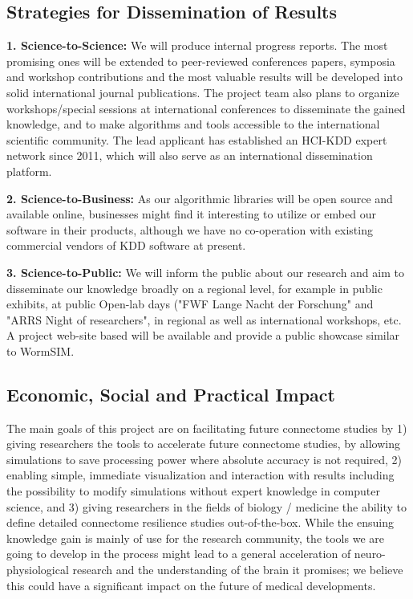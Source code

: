 \documentclass[a4paper,11pt]{article}
\begin{document}
\subsection{Strategies for Dissemination of Results}

\textbf{1. Science-to-Science:} We will produce internal progress reports. The most promising ones will be extended to peer-reviewed conferences papers, symposia and workshop contributions and the most valuable results will be developed into solid international journal publications. The project team also plans to organize workshops/special sessions at international conferences to disseminate the gained knowledge, and to make algorithms and tools accessible to the international scientific community. The lead applicant has established an HCI-KDD expert network since 2011, which will also serve as an international dissemination platform.

\textbf{2. Science-to-Business:} As our algorithmic libraries will be open source and available online, businesses might find it interesting to utilize or embed our software in their products, although we have no co-operation with existing commercial vendors of KDD software at present.

\textbf{3. Science-to-Public:} We will inform the public about our research and aim to disseminate our knowledge broadly on a regional level, for example in public exhibits, at public Open-lab days ("FWF Lange Nacht der Forschung" and "ARRS Night of researchers", in regional as well as international workshops, etc. A project web-site based will be available and provide a public showcase similar to WormSIM.

\subsection{Economic, Social and Practical Impact}


The main goals of this project are on facilitating future connectome studies by 1) giving researchers the tools to accelerate future connectome studies, by allowing simulations to save processing power where absolute accuracy is not required, 2) enabling simple, immediate visualization and interaction with results including the possibility to modify simulations without expert knowledge in computer science, and 3) giving researchers in the fields of biology / medicine the ability to define detailed connectome resilience studies out-of-the-box. While the ensuing knowledge gain is mainly of use for the research community, the tools we are going to develop in the process might lead to a general acceleration of neuro-physiological research and the understanding of the brain it promises; we believe this could have a significant impact on the future of medical developments.
\end{document}

